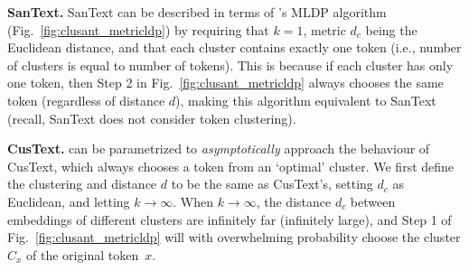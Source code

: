 \vspace{0.5em}

\noindent
\textbf{SanText.} SanText can be described in terms of \clusant's MLDP algorithm (Fig.~\ref{fig:clusant_metricldp}) by requiring that $k = 1$, metric $d_c$ being the Euclidean distance, and that each cluster contains exactly one token (i.e., number of clusters is equal to number of tokens). This is because if each cluster has only one token, then Step 2 in Fig.~\ref{fig:clusant_metricldp} always chooses the same token (regardless of distance $d$), making this algorithm equivalent to SanText (recall, SanText does not consider token clustering).

\vspace{0.5em}

\noindent
\textbf{CusText.} \clusant can be parametrized to {\em asymptotically} approach the behaviour of CusText, which always chooses a token from an `optimal' cluster. We first define the clustering and distance $d$ to be the same as CusText's, setting $d_c$ as Euclidean, and letting $k \rightarrow \infty$. When $k \rightarrow \infty$, the distance $d_c$ between embeddings of different clusters are infinitely far (infinitely large), and Step 1 of Fig.~\ref{fig:clusant_metricldp} will with overwhelming probability choose the cluster $C_x$ of the original token~$x$.